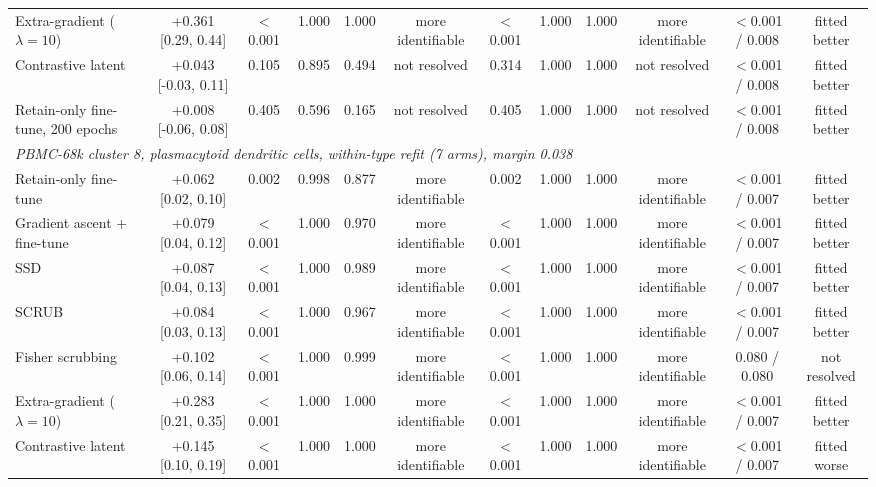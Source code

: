 \begin{tabular}{lccccccccccc}
Extra-gradient ($\lambda=10$) & +0.361 [0.29, 0.44] & $<$0.001 & 1.000 & 1.000 & more identifiable & $<$0.001 & 1.000 & 1.000 & more identifiable & $<$0.001 / 0.008 & fitted better \\
Contrastive latent & +0.043 [-0.03, 0.11] & 0.105 & 0.895 & 0.494 & not resolved & 0.314 & 1.000 & 1.000 & not resolved & $<$0.001 / 0.008 & fitted better \\
Retain-only fine-tune, 200 epochs & +0.008 [-0.06, 0.08] & 0.405 & 0.596 & 0.165 & not resolved & 0.405 & 1.000 & 1.000 & not resolved & $<$0.001 / 0.008 & fitted better \\
\midrule
\multicolumn{12}{l}{\emph{PBMC-68k cluster 8, plasmacytoid dendritic cells, within-type refit (7 arms), margin 0.038}} \\
Retain-only fine-tune & +0.062 [0.02, 0.10] & 0.002 & 0.998 & 0.877 & more identifiable & 0.002 & 1.000 & 1.000 & more identifiable & $<$0.001 / 0.007 & fitted better \\
Gradient ascent + fine-tune & +0.079 [0.04, 0.12] & $<$0.001 & 1.000 & 0.970 & more identifiable & $<$0.001 & 1.000 & 1.000 & more identifiable & $<$0.001 / 0.007 & fitted better \\
SSD & +0.087 [0.04, 0.13] & $<$0.001 & 1.000 & 0.989 & more identifiable & $<$0.001 & 1.000 & 1.000 & more identifiable & $<$0.001 / 0.007 & fitted better \\
SCRUB & +0.084 [0.03, 0.13] & $<$0.001 & 1.000 & 0.967 & more identifiable & $<$0.001 & 1.000 & 1.000 & more identifiable & $<$0.001 / 0.007 & fitted better \\
Fisher scrubbing & +0.102 [0.06, 0.14] & $<$0.001 & 1.000 & 0.999 & more identifiable & $<$0.001 & 1.000 & 1.000 & more identifiable & 0.080 / 0.080 & not resolved \\
Extra-gradient ($\lambda=10$) & +0.283 [0.21, 0.35] & $<$0.001 & 1.000 & 1.000 & more identifiable & $<$0.001 & 1.000 & 1.000 & more identifiable & $<$0.001 / 0.007 & fitted better \\
Contrastive latent & +0.145 [0.10, 0.19] & $<$0.001 & 1.000 & 1.000 & more identifiable & $<$0.001 & 1.000 & 1.000 & more identifiable & $<$0.001 / 0.007 & fitted worse \\
\bottomrule
\end{tabular}
